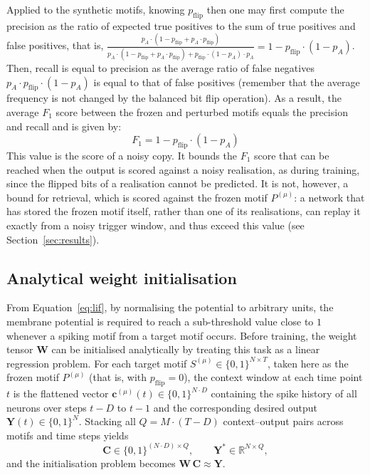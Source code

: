 \documentclass{scrartcl}
\begin{document}
Applied to the synthetic motifs, knowing $p_\mathrm{flip}$ then one may first compute the precision as the ratio of expected true positives to the sum of true positives and false positives, that is, $\frac{p_A \cdot (1 - p_\mathrm{flip} + p_A \cdot p_\mathrm{flip})}{p_A \cdot (1 - p_\mathrm{flip} + p_A \cdot p_\mathrm{flip}) + p_\mathrm{flip} \cdot (1 - p_A) \cdot p_A} = 1 - p_\mathrm{flip} \cdot (1 - p_A)$. Then, recall is equal to precision as the average ratio of false negatives $p_A \cdot p_\mathrm{flip} \cdot (1 - p_A)$ is equal to that of false positives (remember that the average frequency is not changed by the balanced bit flip operation). As a result, the average $F_1$ score between the frozen and perturbed motifs equals the precision and recall and is given by:
\begin{equation}
  F_1 = 1 - p_\mathrm{flip} \cdot (1 - p_A)
  \label{eq:f1}
\end{equation}
This value is the score of a noisy copy. It bounds the $F_1$ score that can be reached when the output is scored against a noisy realisation, as during training, since the flipped bits of a realisation cannot be predicted. It is not, however, a bound for retrieval, which is scored against the frozen motif $P^{(\mu)}$: a network that has stored the frozen motif itself, rather than one of its realisations, can replay it exactly from a noisy trigger window, and thus exceed this value (see Section~\ref{sec:results}).

\subsection{Analytical weight initialisation}
\label{sec:init}
From Equation~\ref{eq:lif}, by normalising the potential to arbitrary units, the membrane potential is required to reach a sub-threshold value close to $1$ whenever a spiking motif from a target motif occurs. Before training, the weight tensor $\mathbf{W}$ can be initialised analytically by treating this task as a linear regression problem. For each target motif $S^{(\mu)} \in \{0,1\}^{N \times T}$, taken here as the frozen motif $P^{(\mu)}$ (that is, with $p_\mathrm{flip} = 0$), the context window at each time point $t$ is the flattened vector $\mathbf{c}^{(\mu)}(t) \in \{0,1\}^{N \cdot D}$ containing the spike history of all neurons over steps $t-D$ to $t-1$ and the corresponding desired output $\mathbf{Y}(t) \in \{0,1\}^N$. Stacking all $Q = M \cdot (T-D)$ context--output pairs across motifs and time steps yields
\[
  \mathbf{C} \in \{0,1\}^{(N \cdot D) \times Q},
  \qquad
  \mathbf{Y}^* \in \mathbb{R}^{N \times Q},
\]
and the initialisation problem becomes $\mathbf{W}\,\mathbf{C} \approx \mathbf{Y}$.
\end{document}
